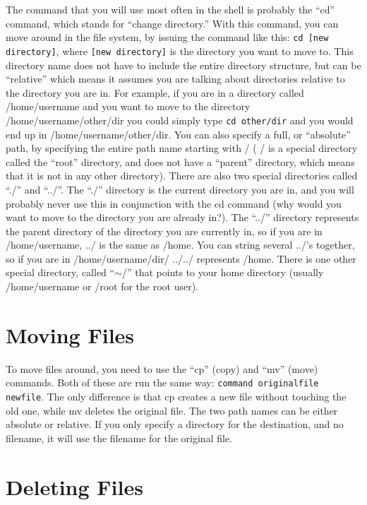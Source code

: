 \documentclass[12pt,letterpaper,oneside, openany]{book} \usepackage[latin1] {inputenc}
\begin{document}
The command that you will use most often in the shell is probably the ``cd'' command, which stands for ``change directory.''  With this command, you can move around in the file system, by issuing the command like this: \verb+cd [new directory]+, where \verb+[new directory]+ is the directory you want to move to.  This directory name does not have to include the entire directory structure, but can be ``relative'' which means it assumes you are talking about directories relative to the directory you are in.  For example, if you are in a directory called /home/username and you want to move to the directory /home/username/other/dir you could simply type \verb+cd other/dir+ and you would end up in /home/username/other/dir.  You can also specify a full, or ``absolute'' path, by specifying the entire path name starting with / ( / is a special directory called the ``root'' directory, and does not have a ``parent'' directory, which means that it is not in any other directory).  There are also two special directories called ``./'' and ``../''.  The ``./'' directory is the current directory you are in, and you will probably never use this in conjunction with the cd command (why would you want to move to the directory you are already in?).  The ``../'' directory represents the parent directory of the directory you are currently in, so if you are in /home/username, ../ is the same as /home.  You can string several ../'s together, so if you are in /home/username/dir/ ../../ represents /home.  There is one other special directory, called ``$\sim$/'' that points to your home directory (usually /home/username or /root for the root user).

\section{Moving Files}

To move files around, you need to use the ``cp'' (copy) and ``mv'' (move) commands.  Both of these are run the same way: \verb+command originalfile newfile+.  The only difference is that cp creates a new file without touching the old one, while mv deletes the original file.  The two path names can be either absolute or relative.  If you only specify a directory for the destination, and no filename, it will use the filename for the original file.

\section{Deleting Files}
\end{document}
